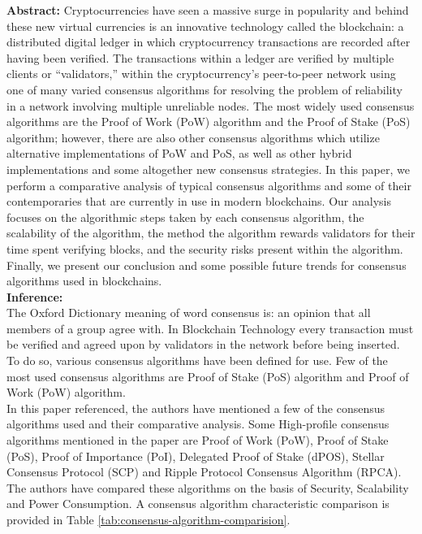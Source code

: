 \documentclass[oneside, 12pt]{book}
\begin{document}
\begin{enumerate}
	      \textbf{Abstract:} Cryptocurrencies have seen a massive surge in popularity and behind these new virtual currencies is an innovative technology called the blockchain: a distributed digital ledger in which cryptocurrency transactions are recorded after having been verified. The transactions within a ledger are verified by multiple clients or “validators,” within the cryptocurrency's peer-to-peer network using one of many varied consensus algorithms for resolving the problem of reliability in a network involving multiple unreliable nodes. The most widely used consensus algorithms are the Proof of Work (PoW) algorithm and the Proof of Stake (PoS) algorithm; however, there are also other consensus algorithms which utilize alternative implementations of PoW and PoS, as well as other hybrid implementations and some altogether new consensus strategies. In this paper, we perform a comparative analysis of typical consensus algorithms and some of their contemporaries that are currently in use in modern blockchains. Our analysis focuses on the algorithmic steps taken by each consensus algorithm, the scalability of the algorithm, the method the algorithm rewards validators for their time spent verifying blocks, and the security risks present within the algorithm. Finally, we present our conclusion and some possible future trends for consensus algorithms used in blockchains.\\
	      \textbf{Inference:}
	      \\The Oxford Dictionary meaning of word consensus is: an opinion that all members of a group agree with. In Blockchain Technology every transaction must be verified and agreed upon by validators in the network before being inserted. To do so, various consensus algorithms have been defined for use. Few of the most used consensus algorithms are Proof of Stake (PoS) algorithm and Proof of Work (PoW) algorithm.
	      \\In this paper referenced, the authors have mentioned a few of the consensus algorithms used and their comparative analysis. Some High-profile consensus algorithms mentioned in the paper are Proof of Work (PoW), Proof of Stake (PoS), Proof of Importance (PoI), Delegated Proof of Stake (dPOS), Stellar Consensus Protocol (SCP) and Ripple Protocol Consensus Algorithm (RPCA). The authors have compared these algorithms on the basis of Security, Scalability and Power Consumption. A consensus algorithm characteristic comparison is provided in Table \ref{tab:consensus-algorithm-comparision}.
	      \begin{table}[H]

\end{table}
\end{enumerate}
\end{document}
